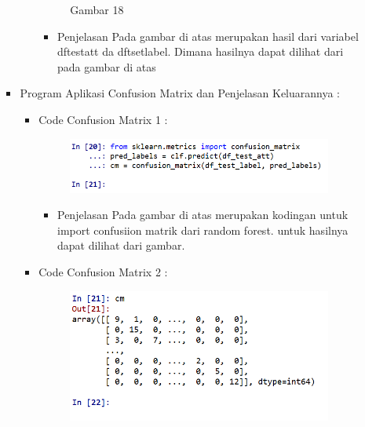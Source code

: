 \begin{enumerate}
\begin{itemize}
\begin{itemize}
\begin{itemize}
\begin{figure}[ht]
\caption{Gambar 18}
\label{contoh}
\end{figure}
\par
\begin{itemize}
\item Penjelasan Pada gambar di atas merupakan hasil dari variabel dftestatt da dftsetlabel. Dimana hasilnya dapat dilihat dari pada gambar di atas
\par
\par
\end{itemize}

\end{itemize}


\par
\par
\item Program Aplikasi Confusion Matrix dan Penjelasan Keluarannya :
\begin{itemize}
\item Code Confusion Matrix 1 :
\par
\begin{figure}[ht]
\centering
\includegraphics[scale=0.7]{figures/andi/RF20.PNG}
\label{contoh}
\end{figure}
\par
\begin{itemize}
\item Penjelasan  Pada gambar di atas merupakan kodingan untuk import confusiion matrik dari random forest. untuk hasilnya dapat dilihat dari gambar.
\par 
\par
\end{itemize}
\item Code Confusion Matrix 2 :
\par
\begin{figure}[ht]
\centering
\includegraphics[scale=0.7]{figures/andi/RF21.PNG}

\end{figure}
\end{itemize}
\end{itemize}
\end{itemize}
\end{enumerate}
